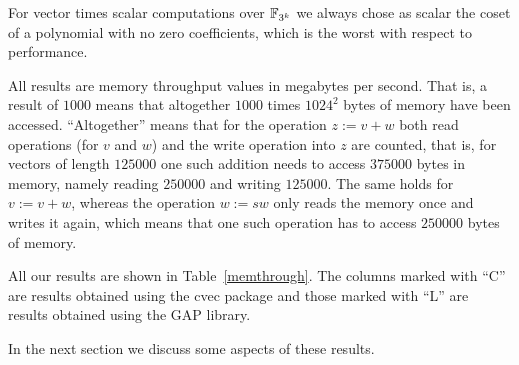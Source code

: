 For vector times scalar computations over $\mathbb{F}_{3^k}$ we always chose as
scalar the coset of a polynomial with no zero coefficients, which is
the worst with respect to performance.

All results are memory throughput values in megabytes per second. 
That is, a result of $1000$ means that altogether $1000$ times
$1024^2$ bytes of memory have been accessed. ``Altogether'' means that for
the operation $z := v+w$ both read operations (for $v$ and $w$) and the
write operation into $z$ are counted, that is, for vectors of length
$125000$ one such addition needs to access $375000$ bytes in memory,
namely reading $250000$ and writing $125000$. The same holds for
$v := v + w$, whereas the operation $w := sw$ only reads the memory once
and writes it again, which means that one such operation has to access
$250000$ bytes of memory.

All our results are shown in Table~\ref{memthrough}. The columns marked
with ``C'' are results obtained using the {\sf cvec} package and those 
marked with ``L'' are results obtained using the {\sf GAP} library.

In the next section we discuss some aspects of these results.

